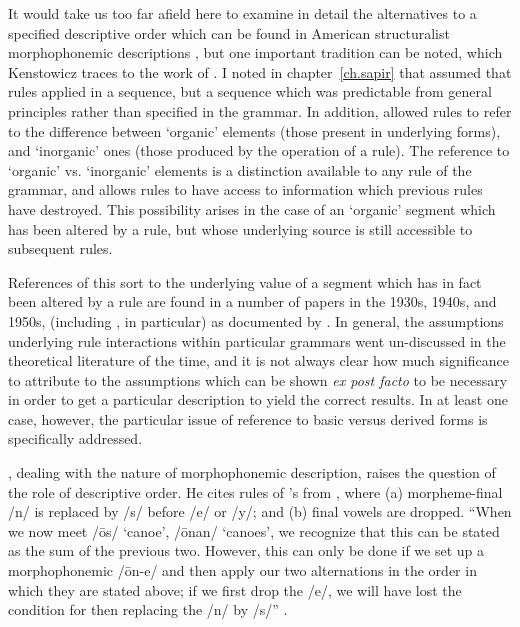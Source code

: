 It would take us too far afield here to examine in detail the
alternatives to a specified descriptive order which can be found in
American structuralist morphophonemic descriptions \citep[for
extensive discussion, see][]{kenstowicz75:application}, but one
important tradition can be noted, which Kenstowicz traces to the work
of {\Sapir}. I noted in chapter~\ref{ch.sapir} that {\Sapir} assumed that
rules applied in a sequence, but a sequence which was predictable from
general principles rather than specified in the grammar. In addition,
{\Sapir} allowed rules to refer to the difference between `organic'
elements (those present in underlying forms), and `inorganic' ones
(those produced by the operation of a rule).  The reference to
`organic' vs. `inorganic' elements is a distinction available to any
rule of the grammar, and allows rules to have access to information
which previous rules have destroyed. This possibility arises in the
case of an `organic' segment which has been altered by a rule, but
whose underlying source is still accessible to subsequent rules.

References of this sort to the underlying value of a segment which has
in fact been altered by a rule are found in a number of papers in the
1930s, 1940s, and 1950s, (including
\citealt{swadesh.voegelin39:alternation}, in particular) as documented
by \citet{kenstowicz75:application}. In general, the assumptions
underlying rule interactions within particular grammars went
un-discussed in the theoretical literature of the time, and it is not
always clear how much significance to attribute to the assumptions
which can be shown \emph{ex post facto} to be necessary in order to
get a particular description to yield the correct results. In at least
one case, however, the particular issue of reference to basic versus
derived forms is specifically addressed.

\citet{harris:methods}, dealing with the nature of morphophonemic
description, raises the question of the role of descriptive order. He
cites rules of {\Bloomfield}'s from , where (a) morpheme-final
/n/ is replaced by /s/ before /e/ or /y/; and (b) final vowels are
dropped. ``When we now meet /ōs/ `canoe', /ōnan/ `canoes', we
recognize that this  can be stated as the sum of the
previous two. However, this can only be done if we set up a
morphophonemic /ōn-e/ and then apply our two alternations in the order
in which they are stated above; if we first drop the /e/, we will have
lost the condition for then replacing the /n/ by /s/''
\citep[237]{harris:methods}.

